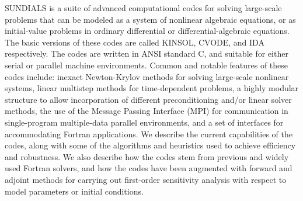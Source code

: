 SUNDIALS is a suite of advanced computational codes for solving
large-scale problems that can be modeled as a system of nonlinear
algebraic equations, or as initial-value problems in ordinary
differential or differential-algebraic equations. The basic versions
of these codes are called KINSOL, CVODE, and IDA respectively. The
codes are written in ANSI standard C, and suitable for either serial
or parallel machine environments.  Common and notable features of
these codes include: inexact Newton-Krylov methods for solving
large-scale nonlinear systems, linear multistep methods for
time-dependent problems, a highly modular structure to allow
incorporation of different preconditioning and/or linear solver
methods, the use of the Message Passing Interface (MPI) for
communication in single-program multiple-data parallel environments,
and a set of interfaces for accommodating Fortran applications.  We
describe the current capabilities of the codes, along with some of the
algorithms and heuristics used to achieve efficiency and robustness.
We also describe how the codes stem from previous and widely used
Fortran solvers, and how the codes have been augmented with forward
and adjoint methods for carrying out first-order sensitivity analysis
with respect to model parameters or initial conditions.
